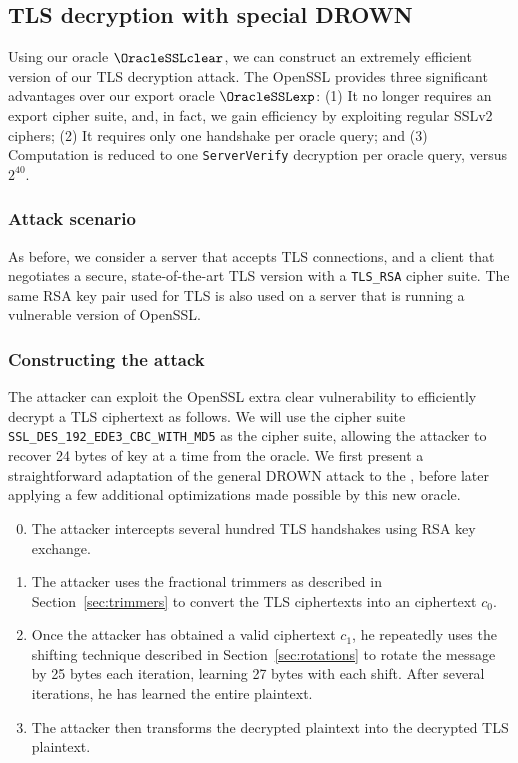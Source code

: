 \subsection{TLS decryption with special DROWN}
\label{sec:clear_analysis}

Using our oracle $\OracleSSLclear$, we can construct an extremely efficient version of our TLS decryption attack.  The OpenSSL \tOracleSSLclear provides three significant advantages over our export oracle $\OracleSSLexp$: (1) It no longer requires an export cipher suite, and, in fact, we gain efficiency by exploiting regular SSLv2 ciphers; (2) It requires only one handshake per oracle query; and (3) Computation is reduced to one \texttt{ServerVerify} decryption per oracle query, versus $2^{40}$.

\subsubsection{Attack scenario}

As before, we consider a server that accepts TLS connections, and a client that negotiates a secure, state-of-the-art TLS version with a \texttt{TLS\_RSA} cipher suite.  The same RSA key pair used for TLS is also used on a server that is running a vulnerable version of OpenSSL.

\subsubsection{Constructing the attack}

The attacker can exploit the OpenSSL extra clear vulnerability to efficiently decrypt a TLS ciphertext as follows.  We will use the cipher suite \texttt{SSL\_DES\_192\_EDE3\_CBC\_WITH\_MD5} as the cipher suite, allowing the attacker to recover 24 bytes of key at a time from the oracle.
We first present a straightforward adaptation of the general DROWN attack to the \tOracleSSLclear,
before later applying a few additional optimizations made possible by this new oracle.

\begin{enumerate}
 \setcounter{enumi}{-1}
 \item The attacker intercepts several hundred TLS handshakes using RSA key exchange.
 \item The attacker uses the fractional trimmers as described in Section~\ref{sec:trimmers} to convert the TLS ciphertexts into an \sslconform ciphertext $c_0$.
 \item Once the attacker has obtained a valid \ssltwo ciphertext $c_1$, he repeatedly uses the shifting technique described in Section~\ref{sec:rotations} to rotate the message by 25 bytes each iteration, learning 27 bytes with each shift.  After several iterations, he has learned the entire plaintext.
 \item The attacker then transforms the decrypted \ssltwo plaintext into the decrypted TLS plaintext. 
 \end{enumerate}


